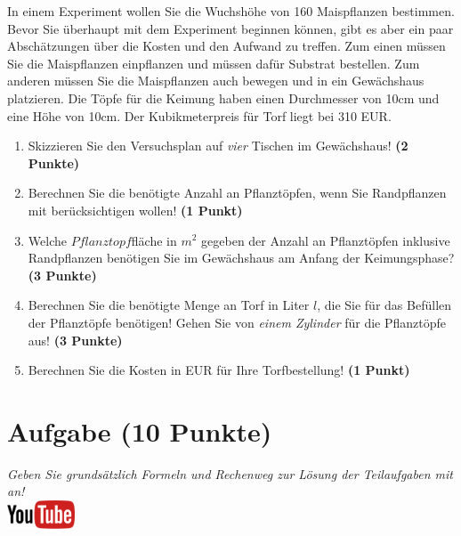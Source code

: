\documentclass[a4paper, 9pt]{scrartcl}\usepackage[]{graphicx}\usepackage[]{xcolor}
\begin{document}
In einem Experiment wollen Sie die Wuchsh{\"o}he von 160
Maispflanzen bestimmen. Bevor Sie {\"u}berhaupt mit dem Experiment beginnen
k{\"o}nnen, gibt es aber ein paar Absch{\"a}tzungen {\"u}ber die Kosten und den Aufwand
zu treffen. Zum einen m{\"u}ssen Sie die Maispflanzen einpflanzen und m{\"u}ssen
daf{\"u}r Substrat bestellen. Zum anderen m{\"u}ssen Sie die Maispflanzen auch
bewegen und in ein Gew{\"a}chshaus platzieren. Die T{\"o}pfe f{\"u}r die Keimung haben
einen Durchmesser von 10cm und eine H{\"o}he von 10cm. Der
Kubikmeterpreis f{\"u}r Torf liegt bei 310 EUR.

\begin{enumerate}
\item Skizzieren Sie den Versuchsplan auf \textit{vier} Tischen im
  Gew{\"a}chshaus! \textbf{(2 Punkte)}
\item Berechnen Sie die ben{\"o}tigte Anzahl an Pflanzt{\"o}pfen, wenn Sie
  Randpflanzen mit ber{\"u}cksichtigen wollen! \textbf{(1 Punkt)}
\item Welche $Pflanztopf$fl{\"a}che in $m^2$ gegeben der Anzahl an
  Pflanzt{\"o}pfen inklusive Randpflanzen ben{\"o}tigen Sie im Gew{\"a}chshaus am
  Anfang der Keimungsphase?  \textbf{(3 Punkte)}
\item Berechnen Sie die ben{\"o}tigte Menge an Torf in Liter $l$, die Sie f{\"u}r
  das Bef{\"u}llen der Pflanzt{\"o}pfe ben{\"o}tigen! Gehen Sie von \textit{einem
    Zylinder} f{\"u}r die Pflanzt{\"o}pfe aus!  \textbf{(3 Punkte)}
\item Berechnen Sie die Kosten in EUR f{\"u}r Ihre Torfbestellung! \textbf{(1
    Punkt)}
\end{enumerate}



 
\clearpage

\section{Aufgabe \hfill (10 Punkte)}

\textit{Geben Sie grunds{\"a}tzlich Formeln und Rechenweg zur L{\"o}sung der
  Teilaufgaben mit an!} \\[1Ex]

\hfill\href{https://youtu.be/n451XnhtSh4}{\includegraphics[width = 2cm]{img/youtube}} %
\hspace{2Ex}
\end{document}
